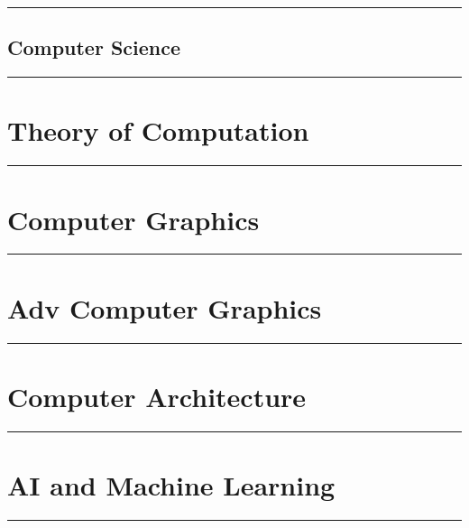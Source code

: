 \documentclass[10pt,titlepage]{asmath}
\newcommand{\hdiv}[3]{
  \vspace{#1}%
  \noindent\rule{\textwidth}{#2}%
  \vspace{#3}%
}
\theoremstyle{definition}
\begin{document}
\newpage
\vspace*{\fill}
\hdiv{10pt}{3pt}{15pt}
\chapter{Computer Science}%
\label{cha:computer_science}
\hdiv{15pt}{3pt}{10pt}
\vspace*{\fill}
\newpage

\newpage
\part{Theory of Computation}
\label{prt:theory_of_computation}
\hdiv{10pt}{2pt}{10pt}
\begin{multicols}{2}
  
\end{multicols}

\newpage
\part{Computer Graphics}
\label{prt:computer_graphics}
\hdiv{10pt}{2pt}{10pt}
\begin{multicols}{2}
  
\end{multicols}

\newpage
\part{Adv Computer Graphics}
\label{prt:adv_computer_graphics}
\hdiv{10pt}{2pt}{10pt}
\begin{multicols}{2}
  
\end{multicols}

\newpage
\part{Computer Architecture}
\label{prt:computer_architecture}
\hdiv{10pt}{2pt}{10pt}
\begin{multicols}{2}
  
\end{multicols}

\newpage
\part{AI and Machine Learning}
\label{prt:ai_and_machine_learning}
\hdiv{10pt}{2pt}{10pt}
\begin{multicols}{2}
  
\end{multicols}
\end{document}
